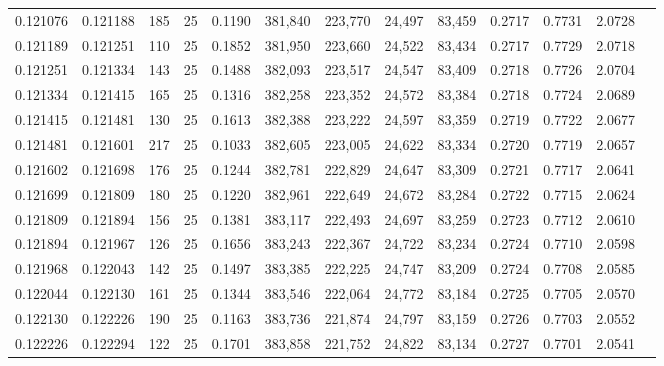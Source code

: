 \begin{tabular}{rrrrrrrrrrrrr}
0.121076 & 0.121188 &   185 &  25 &                                     0.1190 & 381,840 & 223,770 &  24,497 &  83,459 & 0.2717 & 0.7731 & 2.0728 \\
0.121189 & 0.121251 &   110 &  25 &                                     0.1852 & 381,950 & 223,660 &  24,522 &  83,434 & 0.2717 & 0.7729 & 2.0718 \\
0.121251 & 0.121334 &   143 &  25 &                                     0.1488 & 382,093 & 223,517 &  24,547 &  83,409 & 0.2718 & 0.7726 & 2.0704 \\
0.121334 & 0.121415 &   165 &  25 &                                     0.1316 & 382,258 & 223,352 &  24,572 &  83,384 & 0.2718 & 0.7724 & 2.0689 \\
0.121415 & 0.121481 &   130 &  25 &                                     0.1613 & 382,388 & 223,222 &  24,597 &  83,359 & 0.2719 & 0.7722 & 2.0677 \\
0.121481 & 0.121601 &   217 &  25 &                                     0.1033 & 382,605 & 223,005 &  24,622 &  83,334 & 0.2720 & 0.7719 & 2.0657 \\
0.121602 & 0.121698 &   176 &  25 &                                     0.1244 & 382,781 & 222,829 &  24,647 &  83,309 & 0.2721 & 0.7717 & 2.0641 \\
0.121699 & 0.121809 &   180 &  25 &                                     0.1220 & 382,961 & 222,649 &  24,672 &  83,284 & 0.2722 & 0.7715 & 2.0624 \\
0.121809 & 0.121894 &   156 &  25 &                                     0.1381 & 383,117 & 222,493 &  24,697 &  83,259 & 0.2723 & 0.7712 & 2.0610 \\
0.121894 & 0.121967 &   126 &  25 &                                     0.1656 & 383,243 & 222,367 &  24,722 &  83,234 & 0.2724 & 0.7710 & 2.0598 \\
0.121968 & 0.122043 &   142 &  25 &                                     0.1497 & 383,385 & 222,225 &  24,747 &  83,209 & 0.2724 & 0.7708 & 2.0585 \\
0.122044 & 0.122130 &   161 &  25 &                                     0.1344 & 383,546 & 222,064 &  24,772 &  83,184 & 0.2725 & 0.7705 & 2.0570 \\
0.122130 & 0.122226 &   190 &  25 &                                     0.1163 & 383,736 & 221,874 &  24,797 &  83,159 & 0.2726 & 0.7703 & 2.0552 \\
0.122226 & 0.122294 &   122 &  25 &                                     0.1701 & 383,858 & 221,752 &  24,822 &  83,134 & 0.2727 & 0.7701 & 2.0541 \\

\end{tabular}
